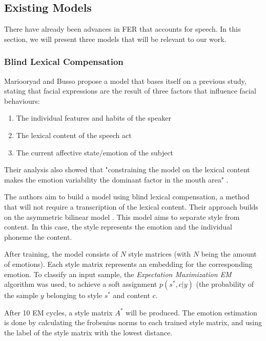 \subsection{Existing Models}
There have already been advances in FER that accounts for speech. In this section, we will present three models that will be relevant to our work.

\subsubsection{Blind Lexical Compensation}
Mariooryad and Busso \cite{mariooryad2015facial} propose a model that bases itself on a previous study, stating that facial expressions are the result of three factors that influence facial behaviours:

\begin{enumerate}
    \item The individual features and habits of the speaker
    \item The lexical content of the speech act
    \item The current affective state/emotion of the subject
\end{enumerate}

Their analysis also showed that "constraining the model on the lexical content makes the emotion variability the dominant factor in the mouth area" \cite{mariooryad2015facial} \cite{mariooryad2012factorizing}.

The authors aim to build a model using blind lexical compensation, a method that will not require a transcription of the lexical content. Their approach builds on the asymmetric bilinear model \cite{tenenbaum1997separating} \cite{tenenbaum2000separating}. This model aims to separate style from content. In this case, the style represents the emotion and the individual phoneme the content.

After training, the model consists of $N$ style matrices (with $N$ being the amount of emotions). Each style matrix represents an embedding for the corresponding emotion. To classify an input sample, the \emph{Expectation Maximization EM} algorithm was used, to achieve a soft assignment $p(s^{*}, c |y)$ (the probability of the sample $y$ belonging to style $s^{*}$ and content $c$.

After 10 EM cycles, a style matrix $A^{*}$ will be produced. The emotion estimation is done by calculating the frobenius norms to each trained style matrix, and using the label of the style matrix with the lowest distance.

